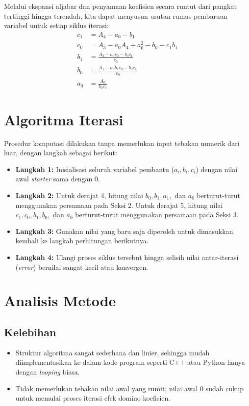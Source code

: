 \documentclass[12pt,a4paper]{article}
\begin{document}
Melalui ekspansi aljabar dan penyamaan koefisien secara runtut dari pangkat tertinggi hingga terendah, kita dapat menyusun urutan rumus pembaruan variabel untuk setiap siklus iterasi:
\begin{align}
c_1 &= A_4 - a_0 - b_1 \\
c_0 &= A_3 - a_0A_4 + a_0^2 - b_0 - c_1b_1 \\
b_1 &= \frac{A_2 - a_0c_0 - b_0c_1}{c_0} \\
b_0 &= \frac{A_1 - a_0b_1c_0 - b_0c_1}{c_0} \\
a_0 &= \frac{A_0}{b_0c_0}
\end{align}

\section{Algoritma Iterasi}
Prosedur komputasi dilakukan tanpa memerlukan input tebakan numerik dari luar, dengan langkah sebagai berikut:
\begin{itemize}
  \item \textbf{Langkah 1:} Inisialisasi seluruh variabel pembantu ($a_i, b_i, c_i$) dengan nilai awal \textit{starter} sama dengan $0$.
  \item \textbf{Langkah 2:} Untuk derajat 4, hitung nilai $b_0, b_1, a_1,$ dan $a_0$ berturut-turut menggunakan persamaan pada Seksi 2. Untuk derajat 5, hitung nilai $c_1, c_0, b_1, b_0,$ dan $a_0$ berturut-turut menggunakan persamaan pada Seksi 3.
  \item \textbf{Langkah 3:} Gunakan nilai yang baru saja diperoleh untuk dimasukkan kembali ke langkah perhitungan berikutnya.
  \item \textbf{Langkah 4:} Ulangi proses siklus tersebut hingga selisih nilai antar-iterasi (\textit{error}) bernilai sangat kecil atau konvergen.
\end{itemize}

\section{Analisis Metode}
\subsection{Kelebihan}
\begin{itemize}
  \item Struktur algoritma sangat sederhana dan linier, sehingga mudah diimplementasikan ke dalam kode program seperti C++ atau Python hanya dengan \textit{looping} biasa.
  \item Tidak memerlukan tebakan nilai awal yang rumit; nilai awal $0$ sudah cukup untuk memulai proses iterasi efek domino koefisien.
\end{itemize}
\end{document}
